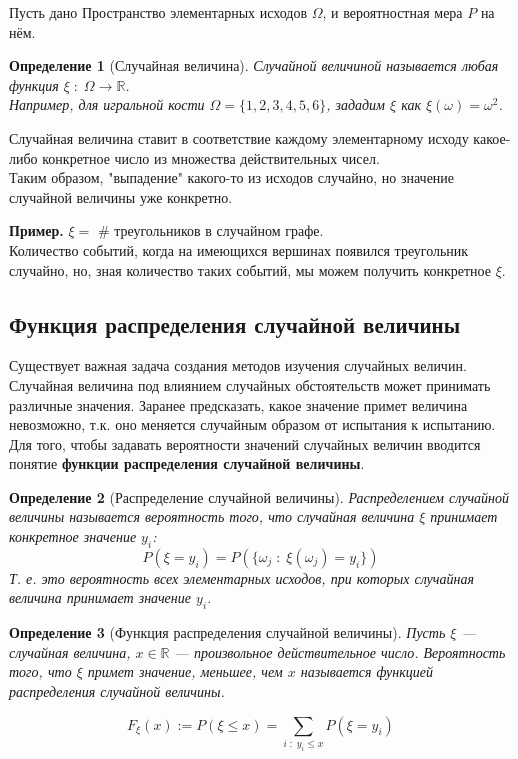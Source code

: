 \documentclass{article}
\theoremstyle{mydef}
\newtheorem{definition}{Определение}
\theoremstyle{myth}
\begin{document}
Пусть дано Пространство элементарных исходов $\Omega$, и вероятностная мера $P$ на нём.

\begin{definition}[Случайная величина]
    Случайной величиной называется любая функция $\xi \; : \; \Omega \rightarrow \mathbb{R}$. \\
    Например, для игральной кости $\Omega = \{1,2,3,4,5,6\}$, зададим $\xi$ как $\xi(\omega) = \omega^2$.
\end{definition}

Случайная величина ставит в соответствие каждому элементарному исходу какое-либо конкретное число из множества действительных чисел. \\
Таким образом, "выпадение" какого-то из исходов случайно, но значение случайной величины уже конкретно.

\textbf{Пример.} $\xi =$ $\#$ треугольников в случайном графе. \\
Количество событий, когда на имеющихся вершинах появился треугольник случайно, но, зная количество таких событий, мы можем получить конкретное $\xi$.

\subsection{Функция распределения случайной величины}

Существует важная задача создания методов изучения случайных величин. \\
Случайная величина под влиянием случайных обстоятельств может принимать различные значения. Заранее предсказать, какое значение примет величина невозможно, т.к. оно меняется случайным образом от испытания к испытанию. \\
Для того, чтобы задавать вероятности значений случайных величин вводится понятие \textbf{функции распределения случайной величины}.

\begin{definition}[Распределение случайной величины]
    Распределением случайной величины называется вероятность того, что случайная величина $\xi$ принимает конкретное значение $y_i$:
    \begin{equation}
        P(\xi = y_i) = P(\{\omega_j \; : \; \xi(\omega_j) = y_i\})
    \end{equation}
Т. е. это вероятность всех элементарных исходов, при которых случайная величина принимает значение $y_i$.
\end{definition}

\begin{definition}[Функция распределения случайной величины]
Пусть $\xi$ --- случайная величина, $x \in \mathbb{R}$ --- произвольное действительное число. Вероятность того, что $\xi$ примет значение, меньшее, чем $x$ называется \textit{функцией распределения случайной величины}.

\begin{equation}
    F_\xi (x) := P(\xi \leq x) = \sum_{i \; : \; y_i \leq x} P(\xi=y_i)
\end{equation}

\end{definition}
\end{document}
